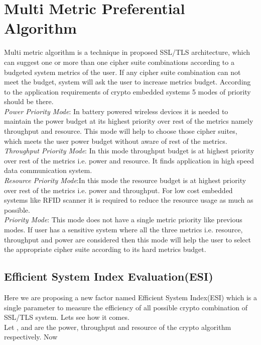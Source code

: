\documentclass[3p,times]{elsarticle}
\begin{document}
\section{Multi Metric Preferential Algorithm}
\label{sec:multi_metric}
Multi metric algorithm is a technique in proposed SSL/TLS architecture, which can suggest one or more than one cipher suite combinations according to a budgeted system metrics of the user. If any cipher suite combination can not meet the budget, system will ask the user to increase metrics  budget.
According to the application requirements of crypto embedded systems 5 modes of priority should be there.\\
 \textit{Power Priority Mode}: In battery powered wireless devices it is needed to maintain the power budget at its highest priority over rest of the metrics namely throughput and resource. This mode will help to choose those cipher suites, which meets the user power budget without aware of rest of the metrics.\\ 
 \textit{Throughput Priority Mode}: In this mode throughput budget is at highest priority over rest of the metrics i.e. power and resource. It finds application in high speed data communication system.\\
 \textit{Resource Priority Mode}:In this mode the resource budget is at highest priority over rest of the metrics i.e. power and throughput. For low cost embedded systems like RFID scanner it is required to reduce the resource usage as much as possible. \\
 \textit{Priority Mode}: This mode does not have a single metric priority like previous modes. If user has a sensitive system where all the three metrics i.e. resource, throughput and power are considered then this mode will help the user to select the appropriate cipher suite according to its hard metrics budget.\\
\subsection{Efficient System Index Evaluation(ESI)}
Here we are proposing a new factor named Efficient System Index(ESI) which is a single parameter to measure the efficiency of all possible crypto combination of SSL/TLS system. Lets see how it comes.\\
Let ,  and  are the power, throughput and resource of the crypto algorithm respectively.
Now\\
\\
\end{document}
